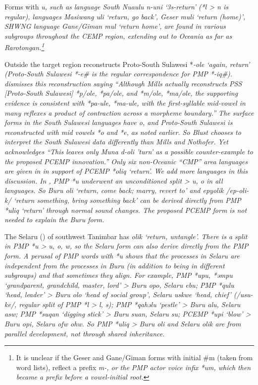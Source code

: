 Forms with \it{u}, such as  language South Nuaulu
\it{n-uni} ‘3s-return’ (*l > \it{n} is regular),
 languages Masiwang \it{uli} ‘return,
go back’, Geser \it{muli} ‘return (home)’,
SHWNG language Gane/Giman \it{mul} ‘return home’,
are found in various subgroups throughout the CEMP region,
extending out to Oceania as far as Rarotongan.\footnote{
It is
unclear if the Geser
and Gane/Giman forms with initial {\#}m (taken from word lists),
reflect a  prefix \it{m-},
or the PMP actor voice infix *\<um\>,
which then became a prefix before a vowel-initial root.}

Outside the target region \citet[879]{Mills1975} reconstructs
Proto-South Sulawesi *\it{-ole} ‘again,
return’ (Proto-South Sulawesi *-e{\#} is the regular correspondence for PMP *-iq{\#}).
\citet[247]{Blust1993} dismisses this reconstruction saying “Although
Mills actually reconstructs PSS [Proto-South Sulawesi] *p/ole,
*pa/ole, and *m/ole, *ma/ole,
the supporting evidence is consistent with *pa-ule,
*ma-ule, with the first-syllable mid-vowel in many reflexes a
product of contraction across a morpheme boundary.” The surface
forms in the South Sulawesi languages have \it{o},
and Proto-South Sulawesi is reconstructed with mid vowels *o
and *e, as noted earlier.
So Blust chooses to interpret the South Sulawesi data differently
than Mills and Nothofer.
Yet \citet[247]{Blust1993} acknowledges “This leaves only Muna
\it{d-oli} 'turn' as a possible counter-example to the proposed
PCEMP innovation.” 
Only six non-Oceanic “CMP” area languages are given in \citet{Blust1993}
in support of PCEMP *oliq ‘return’.
We add more languages in this discussion.
In , PMP *u underwent an unconditioned split >
\it{u, o} in all  languages.
So Buru \it{oli} ‘return,
come back; marry, revert to’
and \it{epyolik} /ep-oli-k/ ‘return something,
bring something back’ \citep{GrimesB1990,GrimesGrimes2020} can be derived directly
from PMP *uliq ‘return’ through normal sound changes.
The proposed PCEMP form is not needed to explain the Buru form.

The Selaru () of southwest Tanimbar
has \it{olik} ‘return, untangle’.
There is a split in PMP *u > \it{u,
o, w}, so the Selaru form can also derive directly from the PMP form.
A perusal of PMP words with *u shows that the processes in Selaru
are independent from the processes in Buru (in addition to being
in different subgroups) and that sometimes they align.
For example, PMP *upu,
*əmpu ‘grandparent, grandchild, master, lord’ > Buru \it{opo},
Selaru \it{ebu}; PMP *qulu ‘head,
leader’ > Buru \it{olo} ‘head of social group’,
Selaru \it{uskwe} ‘head, chief’ (/usu-ke/,
regular split of PMP *l > \it{l,
s}); PMP *qahəlu ‘pestle’ > Buru \it{alu},
Selaru \it{asw}; PMP *suqan ‘digging stick’ > Buru \it{suan},
Selaru \it{su}; PCEMP *upi ‘blow’ > Buru \it{opi},
Selaru \it{ofw {\tl} ohw}.
So PMP *uliq > Buru \it{oli}
and Selaru \it{olik} are from parallel development,
not through shared inheritance.

